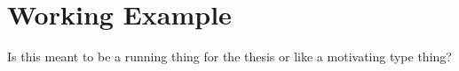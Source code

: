 \chapter{Working Example}
Is this meant to be a running thing for the thesis or like a motivating type thing?